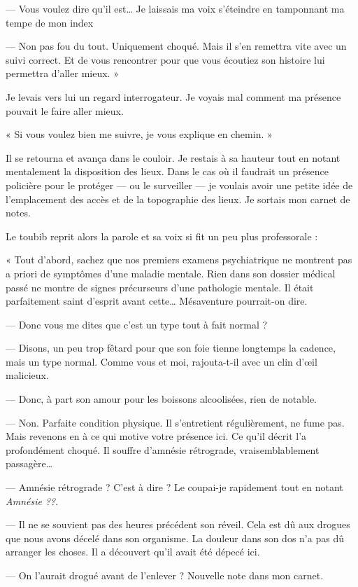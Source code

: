 — Vous voulez dire qu'il est… Je laissais ma voix s'éteindre en tamponnant ma tempe de mon index

— Non pas fou du tout. Uniquement choqué. Mais il s'en remettra vite avec un suivi correct. Et de vous rencontrer pour
que vous écoutiez son histoire lui permettra d'aller mieux. »

Je levais vers lui un regard interrogateur. Je voyais mal comment ma présence pouvait le faire aller mieux.

« Si vous voulez bien me suivre, je vous explique en chemin. »

Il se retourna et avança dans le couloir. Je restais à sa hauteur tout en notant mentalement la disposition des lieux.
Dans le cas où il faudrait un présence policière pour le protéger — ou le surveiller — je voulais avoir une petite idée
de l'emplacement des accès et de la topographie des lieux. Je sortais mon carnet de notes.

Le toubib reprit alors la parole et sa voix si fit un peu plus professorale :

« Tout d'abord, sachez que nos premiers examens psychiatrique ne montrent pas a priori de symptômes d'une maladie
mentale. Rien dans son dossier médical passé ne montre de signes précurseurs d'une pathologie mentale. Il était 
parfaitement saint d'esprit avant cette… Mésaventure pourrait-on dire.

— Donc vous me dites que c'est un type tout à fait normal ?

— Disons, un peu trop fêtard pour que son foie tienne longtemps la cadence, mais un type normal. Comme vous et 
moi, rajouta-t-il avec un clin d'œil malicieux.

— Donc, à part son amour pour les boissons alcoolisées, rien de notable.

— Non. Parfaite condition physique. Il s'entretient régulièrement, ne fume pas. Mais revenons en à ce qui motive votre
présence ici. Ce qu'il décrit l'a profondément choqué. Il souffre d'amnésie rétrograde, vraisemblablement passagère…

— Amnésie rétrograde ? C'est à dire ? Le coupai-je rapidement tout en notant \emph{Amnésie ??}.

— Il ne se souvient pas des heures précédent son réveil. Cela est dû aux drogues que nous avons décelé dans son
organisme. La douleur dans son dos n'a pas dû arranger les choses. Il a découvert qu'il avait été dépecé ici. 

— On l'aurait drogué avant de l'enlever ? Nouvelle note dans mon carnet.

